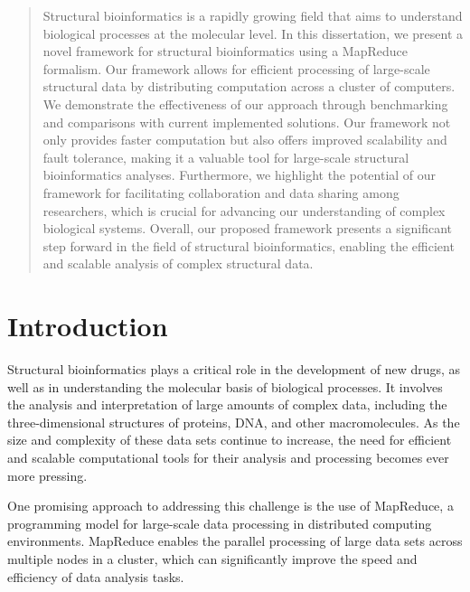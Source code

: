 \documentclass[]{final_report}
\begin{document}
\maketitle

\newtheorem{definition}{Definition}[section]
\renewcommand\thesection{\arabic{section}}

\begin{abstract}
    Structural bioinformatics is a rapidly growing field that aims to understand biological processes at the molecular level. In this dissertation, we present a novel framework for structural bioinformatics using a MapReduce formalism. Our framework allows for efficient processing of large-scale structural data by distributing computation across a cluster of computers. We demonstrate the effectiveness of our approach through benchmarking and comparisons with current implemented solutions. Our framework not only provides faster computation but also offers improved scalability and fault tolerance, making it a valuable tool for large-scale structural bioinformatics analyses. Furthermore, we highlight the potential of our framework for facilitating collaboration and data sharing among researchers, which is crucial for advancing our understanding of complex biological systems. Overall, our proposed framework presents a significant step forward in the field of structural bioinformatics, enabling the efficient and scalable analysis of complex structural data.
\end{abstract}

\section{Introduction}
Structural bioinformatics plays a critical role in the development of new drugs, as well as in understanding the molecular basis of biological processes. It involves the analysis and interpretation of large amounts of complex data, including the three-dimensional structures of proteins, DNA, and other macromolecules. As the size and complexity of these data sets continue to increase, the need for efficient and scalable computational tools for their analysis and processing becomes ever more pressing.

One promising approach to addressing this challenge is the use of MapReduce, a programming model for large-scale data processing in distributed computing environments. MapReduce enables the parallel processing of large data sets across multiple nodes in a cluster, which can significantly improve the speed and efficiency of data analysis tasks.
\end{document}
